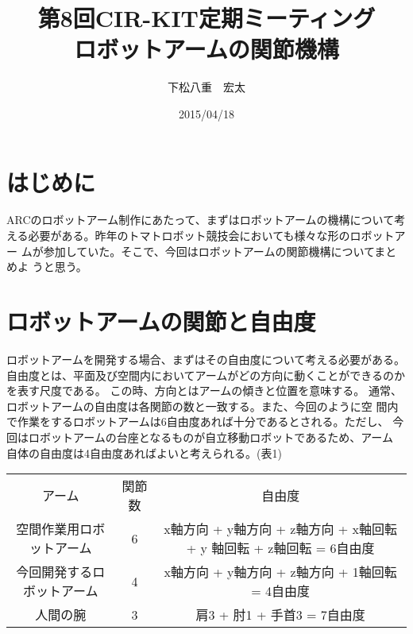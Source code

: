 \documentclass[12pt,a4j]{jarticle}
\title {第8回CIR-KIT定期ミーティング\\ロボットアームの関節機構}
\author {下松八重　宏太}
\date {2015/04/18}
\begin{document}
\maketitle

\section{はじめに}
ARCのロボットアーム制作にあたって、まずはロボットアームの機構について考
える必要がある。昨年のトマトロボット競技会においても様々な形のロボットアー
ムが参加していた。そこで、今回はロボットアームの関節機構についてまとめよ
うと思う。

\section{ロボットアームの関節と自由度}
ロボットアームを開発する場合、まずはその自由度について考える必要がある。
自由度とは、平面及び空間内においてアームがどの方向に動くことができるのか
を表す尺度である。
この時、方向とはアームの傾きと位置を意味する。
通常、ロボットアームの自由度は各関節の数と一致する。また、今回のように空
間内で作業をするロボットアームは6自由度あれば十分であるとされる。ただし、
今回はロボットアームの台座となるものが自立移動ロボットであるため、アーム
自体の自由度は4自由度あればよいと考えられる。(表1)

\begin{table}
 \begin{tabular}{@{\vrule width 1pt}c|c|c@{\ \vrule width 1pt}}
  アーム&関節数 &自由度 \\
  空間作業用ロボットアーム& 6& x軸方向 + y軸方向 + z軸方向 + x軸回転 + y
	  軸回転 + z軸回転 = 6自由度\\
  今回開発するロボットアーム& 4&x軸方向 + y軸方向 + z軸方向 + 1軸回転 =
	  4自由度\\
  人間の腕&3& 肩3 + 肘1 + 手首3 = 7自由度\\
 \end{tabular}
\end{table}
\end{document}
